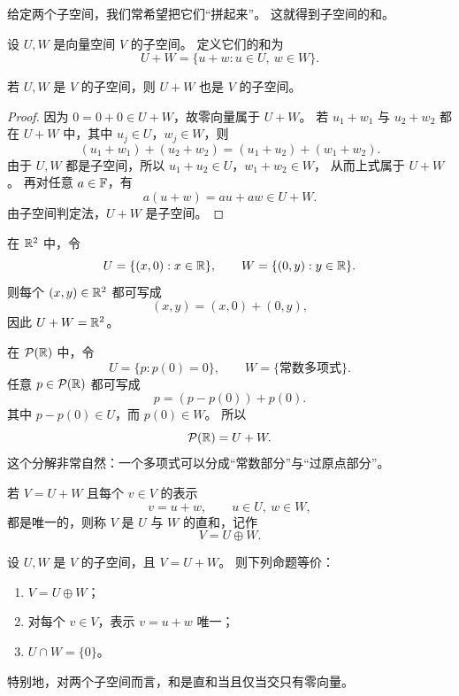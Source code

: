 给定两个子空间，我们常希望把它们“拼起来”。 这就得到子空间的和。

\begin{definition} 设 $U,W$ 是向量空间 $V$ 的子空间。
定义它们的和为 \[
U+W=\{u+w:u\in U,\ w\in W\}. \]
\end{definition}

\begin{proposition} 若 $U,W$ 是 $V$ 的子空间，则 $U+W$ 也是 $V$ 的子空间。
\end{proposition}

\begin{proof} 因为 $0=0+0\in U+W$，故零向量属于 $U+W$。
若 $u_1+w_1$ 与 $u_2+w_2$ 都在 $U+W$ 中，其中 $u_j\in U$，$w_j\in W$，则 \[
(u_1+w_1)+(u_2+w_2)=(u_1+u_2)+(w_1+w_2). \]
由于 $U,W$ 都是子空间，所以 $u_1+u_2\in U$，$w_1+w_2\in W$， 从而上式属于 $U+W$。
再对任意 $a\in\mathbb{F}$，有 \[
a(u+w)=au+aw\in U+W. \]
由子空间判定法，$U+W$ 是子空间。 \end{proof}

\begin{example} 在 $\mathbb{R}^2$ 中，令
\[ U=\{(x,0):x\in\mathbb{R}\},
\qquad W=\{(0,y):y\in\mathbb{R}\}.
\] 则每个 $(x,y)\in\mathbb{R}^2$ 都可写成
\[ (x,y)=(x,0)+(0,y),
\] 因此 $U+W=\mathbb{R}^2$。
\end{example}

\begin{example} 在 $\mathcal{P}(\mathbb{R})$ 中，令
\[ U=\{p:p(0)=0\},
\qquad W=\{\text{常数多项式}\}.
\] 任意 $p\in\mathcal{P}(\mathbb{R})$ 都可写成
\[ p=(p-p(0))+p(0).
\] 其中 $p-p(0)\in U$，而 $p(0)\in W$。
所以 \[
\mathcal{P}(\mathbb{R})=U+W. \]
这个分解非常自然：一个多项式可以分成“常数部分”与“过原点部分”。 \end{example}

\begin{definition} 若 $V=U+W$ 且每个 $v\in V$ 的表示
\[ v=u+w,
\qquad u\in U,\ w\in W, \]
都是唯一的，则称 $V$ 是 $U$ 与 $W$ 的直和，记作 \[
V=U\oplus W. \]
\end{definition}

\begin{theorem}[两个子空间的直和判定] 设 $U,W$ 是 $V$ 的子空间，且 $V=U+W$。
则下列命题等价： \begin{enumerate}[label=\textup{(\arabic*)}]
\item $V=U\oplus W$； \item 对每个 $v\in V$，表示 $v=u+w$ 唯一；
\item $U\cap W=\{0\}$。 \end{enumerate}
特别地，对两个子空间而言，和是直和当且仅当交只有零向量。 \end{theorem}

